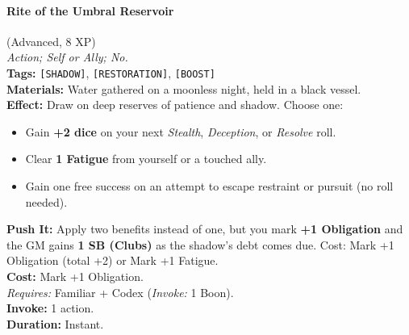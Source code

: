 \paragraph{Rite of the Umbral Reservoir} (Advanced, 8 XP) \hfill \\
\emph{Action; Self or Ally; No.} \\
\textbf{Tags:} \texttt{[SHADOW]}, \texttt{[RESTORATION]}, \texttt{[BOOST]} \\
\textbf{Materials:} Water gathered on a moonless night, held in a black vessel. \\
\textbf{Effect:} Draw on deep reserves of patience and shadow. Choose one:
\begin{itemize}
  \item Gain \textbf{+2 dice} on your next \textit{Stealth}, \textit{Deception}, or \textit{Resolve} roll.
  \item Clear \textbf{1 Fatigue} from yourself or a touched ally.
  \item Gain one free success on an attempt to escape restraint or pursuit (no roll needed).
\end{itemize}
\textbf{Push It:} Apply two benefits instead of one, but you mark \textbf{+1 Obligation} and the GM gains \textbf{1 SB (Clubs)} as the shadow's debt comes due. Cost: Mark +1 Obligation (total +2) or Mark +1 Fatigue. \\
\textbf{Cost:} Mark +1 Obligation. \\
\textit{Requires:} Familiar + Codex (\textit{Invoke:} 1 Boon). \\
\textbf{Invoke:} 1 action. \\
\textbf{Duration:} Instant.

